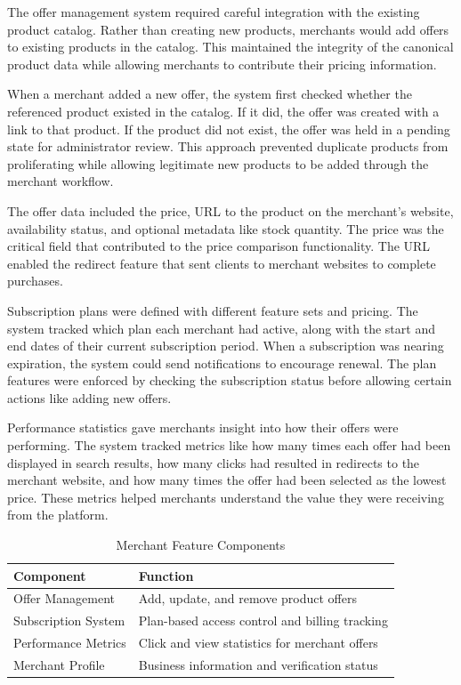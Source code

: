 The offer management system required careful integration with
the existing product catalog. Rather than creating new products,
merchants would add offers to existing products in the catalog.
This maintained the integrity of the canonical product data while
allowing merchants to contribute their pricing information.

When a merchant added a new offer, the system first checked
whether the referenced product existed in the catalog. If it
did, the offer was created with a link to that product. If the
product did not exist, the offer was held in a pending state
for administrator review. This approach prevented duplicate
products from proliferating while allowing legitimate new
products to be added through the merchant workflow.

The offer data included the price, URL to the product on the
merchant's website, availability status, and optional metadata
like stock quantity. The price was the critical field that
contributed to the price comparison functionality. The URL
enabled the redirect feature that sent clients to merchant
websites to complete purchases.

Subscription plans were defined with different feature sets and
pricing. The system tracked which plan each merchant had active,
along with the start and end dates of their current subscription
period. When a subscription was nearing expiration, the system
could send notifications to encourage renewal. The plan features
were enforced by checking the subscription status before allowing
certain actions like adding new offers.

Performance statistics gave merchants insight into how their
offers were performing. The system tracked metrics like how
many times each offer had been displayed in search results,
how many clicks had resulted in redirects to the merchant website,
and how many times the offer had been selected as the lowest
price. These metrics helped merchants understand the value
they were receiving from the platform.

\begin{table}[H]
\begin{center}
\begin{tabular}{|m{3cm}|m{6cm}|}
\hline
\textbf{Component} & \textbf{Function} \\ \hline
Offer Management & Add, update, and remove product offers \\ \hline
Subscription System & Plan-based access control and billing tracking \\ \hline
Performance Metrics & Click and view statistics for merchant offers \\ \hline
Merchant Profile & Business information and verification status \\ \hline
\end{tabular}
\caption{Merchant Feature Components}
\label{tab:merchant_components}
\end{center}
\end{table}

